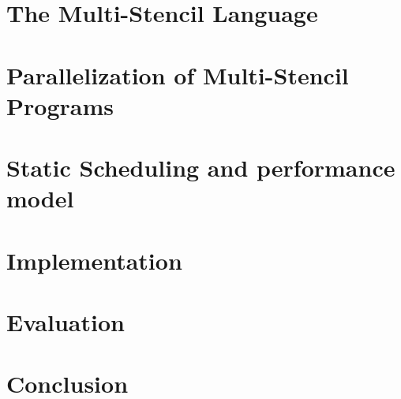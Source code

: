 \documentclass[smallextended]{svjour3}       %
\begin{document}
\section{The Multi-Stencil Language}
\label{sect:msl}

\section{Parallelization of Multi-Stencil Programs}
\label{sect:parallelism}

\section{Static Scheduling and performance model}
\label{sect:msp}

\section{Implementation}
\label{sect:comp}

\section{Evaluation}
\label{sect:eval}

\section{Conclusion}
\label{sect:concl}




\end{document}
